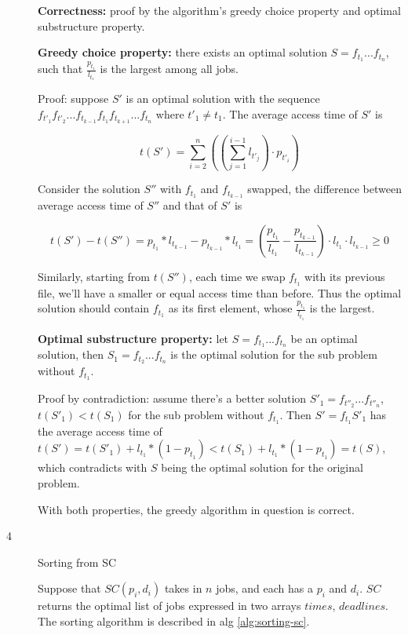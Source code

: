 \documentclass{article}
\begin{document}
\begin{description}
  \textbf{Correctness:} proof by the algorithm's greedy choice property and optimal substructure property.

  \textbf{Greedy choice property:} there exists an optimal solution $S=f_{t_1}...f_{t_n}$, such that $\frac{p_{t_1}}{l_{t_1}}$ is the largest among all jobs.

  Proof: suppose $S'$ is an optimal solution with the sequence $f_{t'_1}f_{t'_2}...f_{t_{k-1}}f_{t_1}f_{t_{k+1}}...f_{t_n}$ where $t'_1 \neq t_1$. The average access time of $S'$ is 

  $$t(S') = \sum_{i=2}^{n}{((\sum_{j=1}^{i-1}{l_{t'_j}}) \cdot p_{t'_i})}$$

  Consider the solution $S''$ with $f_{t_1}$ and $f_{t_{k-1}}$ swapped, the difference between average access time of $S''$ and that of $S'$ is

  $$t(S') - t(S'') = p_{t_{1}} * l_{t_{k-1}} - p_{t_{k-1}} * l_{t_1} = (\frac{p_{t_1}}{l_{t_1}} - \frac{p_{t_{k-1}}}{l_{t_{k-1}}}) \cdot l_{t_1} \cdot l_{t_{k-1}} \geq 0$$

  Similarly, starting from $t(S'')$, each time we swap $f_{t_1}$ with its previous file, we'll have a smaller or equal access time than before. Thus the optimal solution should contain $f_{t_1}$ as its first element, whose $\frac{p_{t_1}}{l_{t_1}}$ is the largest.

  \textbf{Optimal substructure property:} let $S=f_{t_1}...f_{t_n}$ be an optimal solution, then $S_1=f_{t_2}...f_{t_n}$ is the optimal solution for the sub problem without $f_{t_1}$.

  Proof by contradiction: assume there's a better solution $S'_1=f_{t''_2}...f_{t''_n}$, $t(S'_1)<t(S_1)$ for the sub problem without $f_{t_1}$. Then $S'=f_{t_1}S'_1$ has the average access time of $t(S')=t(S'_1) + l_{t_1} * (1-p_{t_1}) < t(S_1) + l_{t_1} * (1-p_{t_1}) = t(S)$, which contradicts with $S$ being the optimal solution for the original problem.

  With both properties, the greedy algorithm in question is correct.

\item[4]{Sorting from SC}
  
  Suppose that $SC(p_i, d_i)$ takes in $n$ jobs, and each has a $p_i$ and $d_i$. $SC$ returns the optimal list of jobs expressed in two arrays $times$, $deadlines$. The sorting algorithm is described in alg \ref{alg:sorting-sc}.


\end{description}
\end{document}
